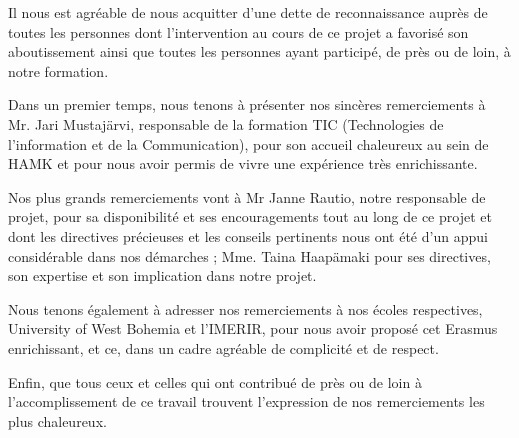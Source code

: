 
Il nous est agréable de nous acquitter d’une dette de reconnaissance auprès de toutes les personnes dont l’intervention au cours de ce projet a favorisé son aboutissement ainsi que toutes les personnes ayant participé, de près ou de loin, à notre formation.

Dans un premier temps, nous tenons à présenter nos sincères remerciements à Mr. Jari Mustajärvi, responsable de la formation TIC (Technologies de l'information et de la Communication), pour son accueil chaleureux au sein de HAMK et pour nous avoir permis de vivre une expérience très enrichissante.

Nos plus grands remerciements vont à Mr Janne Rautio, notre responsable de projet, pour sa disponibilité et ses encouragements tout au long de ce projet et dont les directives précieuses et les conseils pertinents nous ont été d’un appui considérable dans nos démarches ; Mme. Taina Haapämaki pour ses directives, son expertise et son implication dans notre projet.

Nous tenons également à adresser nos remerciements à nos écoles respectives, University of West Bohemia et l'IMERIR, pour nous avoir proposé cet Erasmus enrichissant, et ce, dans un cadre agréable de complicité et de respect.

Enfin, que tous ceux et celles qui ont contribué de près ou de loin à l’accomplissement de ce travail trouvent l’expression de nos remerciements les plus chaleureux.


